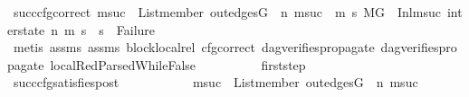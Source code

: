 \begin{isabellebody}
\ succ{\isacharunderscore}{\kern0pt}cfg{\isacharunderscore}{\kern0pt}correct{\isacharcolon}{\kern0pt}\ {\isachardoublequoteopen}{\isacharparenleft}{\kern0pt}{\isasymforall}msuc{}{\isachardot}{\kern0pt}\ \ List{\isachardot}{\kern0pt}member\ {\isacharparenleft}{\kern0pt}out{\isacharunderscore}{\kern0pt}edges{\isacharparenleft}{\kern0pt}G{\isacharparenright}{\kern0pt}\ {\isacharbang}{\kern0pt}\ n{\isacharparenright}{\kern0pt}\ msuc{}\ {\isasymlongrightarrow}\ {\isacharparenleft}{\kern0pt}{\isasymforall}m{}\ s{}{\isachardot}{\kern0pt}\ {\isacharparenleft}{\kern0pt}{\isacharparenleft}{\kern0pt}M{\isacharcomma}{\kern0pt}{\isasymLambda}{\isacharcomma}{\kern0pt}{\isasymGamma}{\isacharcomma}{\kern0pt}{\isasymOmega}{\isacharcomma}{\kern0pt}G\ {\isasymturnstile}\ {\isacharparenleft}{\kern0pt}Inl{\isacharparenleft}{\kern0pt}msuc{}{\isacharparenright}{\kern0pt}{\isacharcomma}{\kern0pt}\ inter{\isacharunderscore}{\kern0pt}state{\isacharparenright}{\kern0pt}\ {\isacharminus}{\kern0pt}n{\isasymrightarrow}{\isacharasterisk}{\kern0pt}\ {\isacharparenleft}{\kern0pt}m{}{\isacharcomma}{\kern0pt}\ s{}{\isacharparenright}{\kern0pt}{\isacharparenright}{\kern0pt}\ {\isasymlongrightarrow}\ s{}\ {\isasymnoteq}\ Failure{\isacharparenright}{\kern0pt}{\isacharparenright}{\kern0pt}{\isacharparenright}{\kern0pt}{\isachardoublequoteclose}\isanewline
\ \ \ \ \ \ \ \ \ \ \isamarkupfalse%
\ {\isacharparenleft}{\kern0pt}metis\ assms{\isacharparenleft}{\kern0pt}{}{\isacharparenright}{\kern0pt}\ assms{\isacharparenleft}{\kern0pt}{}{\isacharparenright}{\kern0pt}\ block{\isacharunderscore}{\kern0pt}local{\isacharunderscore}{\kern0pt}rel\ cfg{\isacharunderscore}{\kern0pt}correct\ dag{\isacharunderscore}{\kern0pt}verifies{\isacharunderscore}{\kern0pt}propagate\ dag{\isacharunderscore}{\kern0pt}verifies{\isacharunderscore}{\kern0pt}propagate{\isacharunderscore}{\kern0pt}{}\ local{\isachardot}{\kern0pt}RedParsedWhileFalse{\isacharparenleft}{\kern0pt}{}{\isacharparenright}{\kern0pt}{\isacharparenright}{\kern0pt}\isanewline
\isanewline
\ \ \ \ \ \ \ \ \isamarkupfalse%
\ first{\isacharunderscore}{\kern0pt}step\isanewline
\ \ \ \ \ \ \ \ \isamarkupfalse%
\ succ{\isacharunderscore}{\kern0pt}cfg{\isacharunderscore}{\kern0pt}satisfies{\isacharunderscore}{\kern0pt}post{\isacharcolon}{\kern0pt}\ \isanewline
\ \ \ \ \ \ \ \ \ \ {\isachardoublequoteopen}{\isacharparenleft}{\kern0pt}{\isasymforall}msuc{}{\isachardot}{\kern0pt}\ \ List{\isachardot}{\kern0pt}member\ {\isacharparenleft}{\kern0pt}out{\isacharunderscore}{\kern0pt}edges{\isacharparenleft}{\kern0pt}G{\isacharparenright}{\kern0pt}\ {\isacharbang}{\kern0pt}\ n{\isacharparenright}{\kern0pt}\ msuc{}\ {\isasymlongrightarrow}\ \isanewline

\end{isabellebody}

